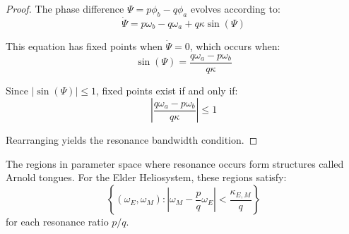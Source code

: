\begin{proof}
The phase difference $\Psi = p\phi_b - q\phi_a$ evolves according to:
\begin{equation}
\dot{\Psi} = p\omega_b - q\omega_a + q\kappa\sin(\Psi)
\end{equation}

This equation has fixed points when $\dot{\Psi} = 0$, which occurs when:
\begin{equation}
\sin(\Psi) = \frac{q\omega_a - p\omega_b}{q\kappa}
\end{equation}

Since $|\sin(\Psi)| \leq 1$, fixed points exist if and only if:
\begin{equation}
\left|\frac{q\omega_a - p\omega_b}{q\kappa}\right| \leq 1
\end{equation}

Rearranging yields the resonance bandwidth condition.
\end{proof}

\begin{definition}
The regions in parameter space where resonance occurs form structures called Arnold tongues. For the Elder Heliosystem, these regions satisfy:
\begin{equation}
\left\{(\omega_E, \omega_M) : \left|\omega_M - \frac{p}{q}\omega_E\right| < \frac{\kappa_{E,M}}{q} \right\}
\end{equation}
for each resonance ratio $p/q$.
\end{definition}

